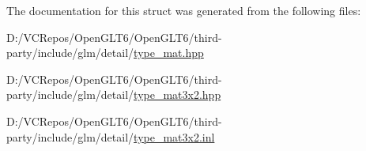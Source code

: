 The documentation for this struct was generated from the following files\+:\begin{DoxyCompactItemize}
\item 
D\+:/\+V\+C\+Repos/\+Open\+G\+L\+T6/\+Open\+G\+L\+T6/third-\/party/include/glm/detail/\mbox{\hyperlink{type__mat_8hpp}{type\+\_\+mat.\+hpp}}\item 
D\+:/\+V\+C\+Repos/\+Open\+G\+L\+T6/\+Open\+G\+L\+T6/third-\/party/include/glm/detail/\mbox{\hyperlink{type__mat3x2_8hpp}{type\+\_\+mat3x2.\+hpp}}\item 
D\+:/\+V\+C\+Repos/\+Open\+G\+L\+T6/\+Open\+G\+L\+T6/third-\/party/include/glm/detail/\mbox{\hyperlink{type__mat3x2_8inl}{type\+\_\+mat3x2.\+inl}}\end{DoxyCompactItemize}
